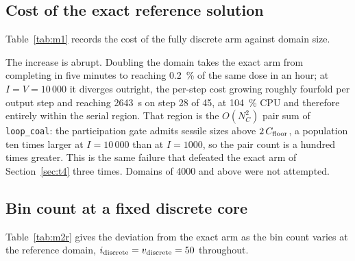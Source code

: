 \documentclass[11pt]{article}
\begin{document}
\FloatBarrier
\subsection{Cost of the exact reference solution}

Table~\ref{tab:m1} records the cost of the fully discrete arm against domain
size.

\begin{table}[htbp]
\centering
\caption{Cost of the fully discrete arm against domain size. The emphasised row
is the only one that completes, and is the reference for what follows.}
\label{tab:m1}

\end{table}

The increase is abrupt. Doubling the domain takes the exact arm from completing
in five minutes to reaching \SI{0.2}{\percent} of the same dose in an hour; at
$I = V = 10\,000$ it diverges outright, the per-step cost growing roughly
fourfold per output step and reaching \SI{2643}{\second} on step 28 of 45, at
\SI{104}{\percent} CPU and therefore entirely within the serial region. That
region is the $O(N_C^2)$ pair sum of \texttt{loop\_coal}: the participation gate
admits sessile sizes above $2\,C_{\rm floor}$, a population ten times larger at
$I = 10\,000$ than at $I = 1000$, so the pair count is a hundred times greater.
This is the same failure that defeated the exact arm of Section~\ref{sec:t4}
three times. Domains of 4000 and above were not attempted.

\FloatBarrier
\subsection{Bin count at a fixed discrete core}

Table~\ref{tab:m2r} gives the deviation from the exact arm as the bin count
varies at the reference domain, $i_{\rm discrete} = v_{\rm discrete} = 50$
throughout.

\begin{table}[htbp]
\centering
\caption{Deviation from the exact arm (\si{\percent}) at \SI{20}{dpa},
$I=V=1000$, with $i_{\rm discrete} = v_{\rm discrete} = 50$ throughout. Only the
bin count varies.}
\label{tab:m2r}

\end{table}
\end{document}
